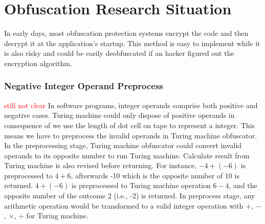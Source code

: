 \section{Obfuscation Research Situation}
In early days, most obfuscation protection systems encrypt the code and then decrypt it at the application's startup. This method is easy to implement while it is also risky and could be easily deobfuscated if an hacker figured out the encryption algorithm.




\subsubsection{Negative Integer Operand Preprocess}
\textcolor{red}{still not clear}
In software programs, integer operands comprise both positive and negative
cases. Turing machine could only dispose of positive operands in consequence of
we use the length of dot cell on tape to represent a integer. This means we have
to preprocess the invalid operands in Turing machine obfuscator. In the
preprocessing stage, Turing machine obfuscator could convert invalid operands to
its opposite number to run Turing machine. Calculate result from Turing machine
is also revised before returning. For instance, $-4 + (-6)$ is preprocessed to
$4 + 6$, afterwards -10 which is the opposite number of 10 is returned. $4 +
(-6)$ is preprocessed to Turing machine operation $6 - 4$, and the opposite
number of the outcome 2 (i.e., -2) is returned. In preprocess stage, any
arithmetic operation would be transformed to a valid integer operation with $+$,
$-$, $\times$, $\div$ for Turing machine.